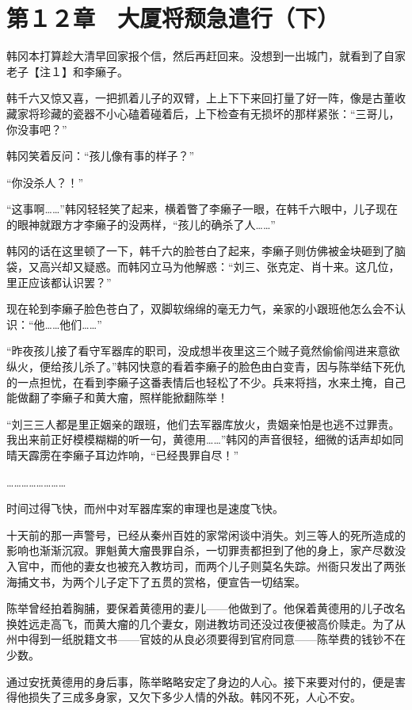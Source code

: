 \section{第１２章　大厦将颓急遣行（下）}

韩冈本打算趁大清早回家报个信，然后再赶回来。没想到一出城门，就看到了自家老子【注１】和李癞子。

韩千六又惊又喜，一把抓着儿子的双臂，上上下下来回打量了好一阵，像是古董收藏家将珍藏的瓷器不小心磕着碰着后，上下检查有无损坏的那样紧张：“三哥儿，你没事吧？”

韩冈笑着反问：“孩儿像有事的样子？”

“你没杀人？！”

“这事啊……”韩冈轻轻笑了起来，横着瞥了李癞子一眼，在韩千六眼中，儿子现在的眼神就跟方才李癞子的没两样，“孩儿的确杀了人……”

韩冈的话在这里顿了一下，韩千六的脸苍白了起来，李癞子则仿佛被金块砸到了脑袋，又高兴却又疑惑。而韩冈立马为他解惑：“刘三、张克定、肖十来。这几位，里正应该都认识罢？”

现在轮到李癞子脸色苍白了，双脚软绵绵的毫无力气，亲家的小跟班他怎么会不认识：“他……他们……”

“昨夜孩儿接了看守军器库的职司，没成想半夜里这三个贼子竟然偷偷闯进来意欲纵火，便给孩儿杀了。”韩冈快意的看着李癞子的脸色由白变青，因与陈举结下死仇的一点担忧，在看到李癞子这番表情后也轻松了不少。兵来将挡，水来土掩，自己能做翻了李癞子和黄大瘤，照样能掀翻陈举！

“刘三三人都是里正姻亲的跟班，他们去军器库放火，贵姻亲怕是也逃不过罪责。我出来前正好模模糊糊的听一句，黄德用……”韩冈的声音很轻，细微的话声却如同晴天霹雳在李癞子耳边炸响，“已经畏罪自尽！”

……………………

时间过得飞快，而州中对军器库案的审理也是速度飞快。

十天前的那一声警号，已经从秦州百姓的家常闲谈中消失。刘三等人的死所造成的影响也渐渐沉寂。罪魁黄大瘤畏罪自杀，一切罪责都担到了他的身上，家产尽数没入官中，而他的妻女也被充入教坊司，而两个儿子则莫名失踪。州衙只发出了两张海捕文书，为两个儿子定下了五贯的赏格，便宣告一切结案。

陈举曾经拍着胸脯，要保着黄德用的妻儿——他做到了。他保着黄德用的儿子改名换姓远走高飞，而黄大瘤的几个妻女，刚进教坊司还没过夜便被高价赎走。为了从州中得到一纸脱籍文书——官妓的从良必须要得到官府同意——陈举费的钱钞不在少数。

通过安抚黄德用的身后事，陈举略略安定了身边的人心。接下来要对付的，便是害得他损失了三成多身家，又欠下多少人情的外敌。韩冈不死，人心不安。

